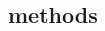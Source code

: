 \documentclass[a4paper]{article}
\begin{document}
\begin{multicols}{2}
%
%

\section{ methods}%
\label{sub:h2o_methods}




\end{multicols}
\end{document}

